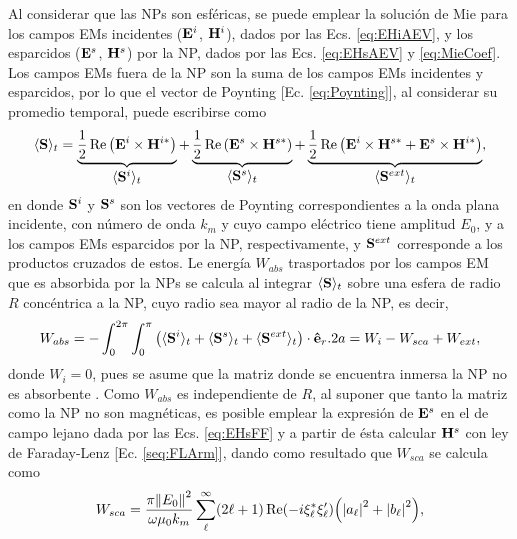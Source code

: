 Al considerar que las NPs son esféricas, se puede emplear la solución de Mie para los campos EMs incidentes ($\vb{E}^i$, $\vb{H}^i$), dados por las Ecs. \eqref{eq:EHiAEV}, y los esparcidos ($\vb{E}^s$, $\vb{H}^s$) por la NP,  dados por las Ecs. \eqref{eq:EHsAEV} y \eqref{eq:MieCoef}. Los campos EMs fuera de la NP son la suma de los campos EMs incidentes y esparcidos, por lo que el vector de Poynting [Ec. \eqref{eq:Poynting}], al considerar su promedio temporal, puede escribirse como \cite{bohren1998absorption}
%
\begin{align*}
\langle\vb{S}\rangle_t 
		= \underbrace{\frac12 \Re \qty(\vb{E}^i\times\vb{H}^{i*})}_{\text{\normalsize $\langle\vb{S}^i\rangle_t $}} + 
		\underbrace{\frac12 \Re \qty(\vb{E}^s\times\vb{H}^{s*})}_{\text{\normalsize $\langle\vb{S}^s\rangle_t $}}+
		\underbrace{	\frac12 \Re\qty(\vb{E}^i\times\vb{H}^{s*} + \vb{E}^s\times\vb{H}^{i*})}_{\text{\normalsize$\langle\vb{S}^{ext}\rangle_t $}},
\end{align*}
%
en donde $\vb{S}^i$ y $\vb{S}^s$ son los vectores de Poynting correspondientes a la onda plana incidente, con número de onda $k_m$ y cuyo campo eléctrico tiene amplitud $E_0$, y a los campos EMs esparcidos por la NP, respectivamente, y $\vb{S}^{ext}$ corresponde a los productos cruzados de estos. Le energía $W_{abs}$ trasportados por los campos EM que es absorbida por la NPs se calcula al integrar $\langle\vb{S}\rangle_t$ sobre una esfera de radio $R$ concéntrica a la NP, cuyo radio sea mayor al radio de la NP, es decir,
%
\begin{equation}
W_{abs} = - \int_0^{2\pi}\int_0^{\pi}
		\qty(\langle\vb{S}^i\rangle_t +\langle\vb{S}^s\rangle_t 
				+\langle\vb{S}^{ext}\rangle_t )
		\cdot \vu{e}_r .2 a
		 = W_i-W_{sca}+W_{ext},
		 \label{eq:WaAll}
\end{equation}
%
donde $W_i = 0$, pues se asume que la matriz donde se encuentra inmersa la NP no es absorbente \cite{bohren1998absorption}. Como $W_{abs}$ es independiente de $R$, al suponer que tanto la matriz como la NP no son magnéticas, es posible emplear la expresión de $\vb{E}^s$ en el de campo lejano dada por las Ecs. \eqref{eq:EHsFF} y a partir de ésta calcular $\vb{H}^s$ con ley de Faraday-Lenz [Ec. \eqref{seq:FLArm}], dando como resultado que $W_{sca}$ se calcula como \cite{bohren1998absorption}
 	\begin{equation}
W_{sca} = \frac{\pi\norm{E_0}^2}{\omega\mu_0 k_m}
		\sum_\ell^\infty (2\ell+1)\Re(-i\xi_\ell^*\xi_\ell')\qty(\abs{a_\ell}^2+\abs{b_\ell}^2),
	\label{eq:WsAll}
	\end{equation}
